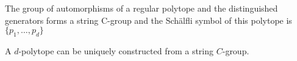 \begin{property}
  The group of automorphisms of a regular polytope and the distinguished generators forms a string C-group and the Schälfli symbol of this polytope is $\{p_1, \dots, p_d\}$
\end{property}

\begin{property}
  A $d$-polytope can be uniquely constructed from a string $C$-group.
\end{property}

\begin{property}
  
\end{property}
